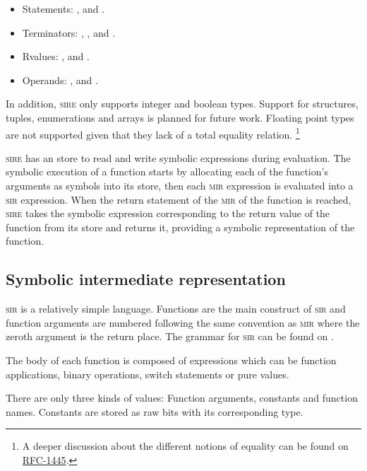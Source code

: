 \begin{itemize}
    \item Statements: ,  and .
    \item Terminators: , ,  and .
    \item Rvalues: ,  and .
    \item Operands: ,  and .
\end{itemize}

In addition, \textsc{sire} only supports integer and boolean types. Support for
structures, tuples, enumerations and arrays is planned for future work. Floating
point types are not supported given that they lack of a total equality relation. \footnote{A deeper discussion about the different notions of equality can be found on
\href{https://github.com/rust-lang/rfcs/blob/master/text/1445-restrict-constants-in-patterns.md}{RFC-1445}.}

\textsc{sire} has an store to read and write symbolic expressions during
evaluation. The symbolic execution of a function starts by allocating each of
the function's arguments as symbols into its store, then each \textsc{mir}
expression is evaluated into a \textsc{sir} expression. When the return
statement of the \textsc{mir} of the function is reached, \textsc{sire} takes
the symbolic expression corresponding to the return value of the function from
its store and returns it, providing a symbolic representation of the function. 


\subsection{Symbolic intermediate representation}

\textsc{sir} is a relatively simple language. Functions are the main construct
of \textsc{sir} and function arguments are numbered following the same
convention as \textsc{mir} where the zeroth argument is the return place. The
grammar for \textsc{sir} can be found on .

The body of each function is composed of expressions which can be function
applications, binary operations, switch statements or pure values. 

There are only three kinds of values: Function arguments, constants and
function names. Constants are stored as raw bits with its corresponding type. 

